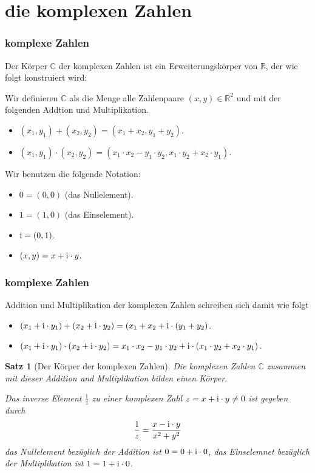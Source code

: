 \documentclass[hyperref={pdfpagelabels=false}]{beamer}
\theoremstyle{plain}%
\newtheorem*{satz}{Satz}
\theoremstyle{definition}
\theoremstyle{remark}
\def \ii{{\relax\ifmmode \mathrm{i} \else i \fi}}
\def \R{\mathbb R}
\def \C{\mathbb C}
\begin{document}
\section{die komplexen Zahlen}
\begin{frame}
\frametitle{komplexe Zahlen}

Der Körper $\C$ der komplexen Zahlen ist ein Erweiterungskörper von $\R$, der wie folgt konstruiert wird: 

\pause 

Wir definieren $\C$ als die Menge alle Zahlenpaare $(x,y) \in \mathbb R^2$ und mit der folgenden Addtion 
und Multiplikation.

\begin{itemize}
\item<3-> $(x_1, y_1) + (x_2, y_2) = (x_1+x_2, y_1+y_2)$. 
\item<4-> $(x_1,y_1) \cdot (x_2,y_2) = (x_1 \cdot x_2 - y_1 \cdot y_2, x_1 \cdot y_2 + x_2 \cdot y_1)$. 
\end{itemize}

\pause \pause \pause 
Wir benutzen die folgende Notation: 

\begin{itemize}
\item[] $0 = (0,0)$ (das Nullelement).
\item[] $1 = (1,0)$ (das Einselement). 
\item[] $\ii = (0,1)$. 
\item[] $(x,y) = x+\ii \cdot y$. 
\end{itemize}


\end{frame}


\begin{frame}
\frametitle{komplexe Zahlen}

Addition und Multiplikation der komplexen Zahlen schreiben sich damit wie folgt

\begin{itemize}
\item<2-> $(x_1 + \ii \cdot y_1) + (x_2+ \ii \cdot y_2) =(x_1+x_2 + \ii \cdot (y_1+y_2)$. 
\item<3-> $(x_1 + \ii \cdot y_1) \cdot (x_2 + \ii \cdot y_2) 
= x_1 \cdot x_2 - y_1 \cdot y_2 + \ii \cdot (x_1 \cdot y_2 + x_2 \cdot y_1)$. 
\end{itemize}

\pause \pause 

\begin{satz}[Der Körper der komplexen Zahlen]
Die komplexen Zahlen $\C$ zusammen mit dieser Addition und Multiplikation bilden einen Körper. 

\pause 
Das inverse Element $\frac {1}{z}$ zu einer komplexen Zahl $z = x + \ii \cdot y \neq 0$ ist gegeben durch 
	$$ \frac {1}{z} = \frac {x - \ii \cdot y}{x^2+y^2} $$
das Nullelement bezüglich der Addition ist $0 = 0 + \ii \cdot 0$, das Einselemnet bezüglich der Multiplikation 
ist $1 = 1 + \ii \cdot 0$.  
\end{satz}

\end{frame}
\end{document}
